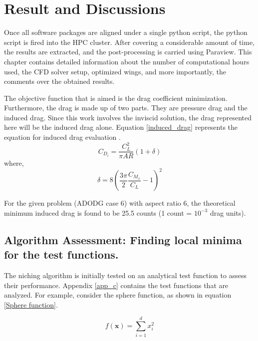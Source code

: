 \chapter{Result and Discussions}
\label{results}
Once all software packages are aligned under a single python script, the python script is fired into the HPC cluster. After covering a considerable amount of time, the results are extracted, and the post-processing is carried using Paraview. This chapter contains detailed information about the number of computational hours used, the CFD solver setup, optimized wings, and more importantly, the comments over the obtained results.

The objective function that is aimed is the drag coefficient minimization. Furthermore, the drag is made up of two parts. They are pressure drag and the induced drag. Since this work involves the inviscid solution, the drag represented here will be the induced drag alone. Equation \ref{induced_drag} represents the equation for induced drag evaluation \cite{Poole1}. 
\begin{equation}
C_{D_{i}}=\frac{C_{L}^{2}}{\pi A R}(1+\delta)
\label{induced_drag}
\end{equation}
where,\\
$$\delta=8\left(\frac{3 \pi}{2} \frac{C_{M_{x}}}{C_{L}}-1\right)^{2}$$

For the given problem (ADODG case 6) with aspect ratio 6, the theoretical minimum induced drag is found to be 25.5 counts (1 count = $10^{-3}$ drag units).

\section{Algorithm Assessment: Finding local minima for the test functions.}
The niching algorithm is initially tested on an analytical test function to assess their performance. Appendix \ref{app_c} contains the test functions that are analyzed. For example, consider the sphere function, as shown in equation \ref{Sphere function}.

\begin{equation}
f(\mathbf{x})=\sum_{i=1}^{d} x_{i}^{2}
\label{sphere_function}
\end{equation}

